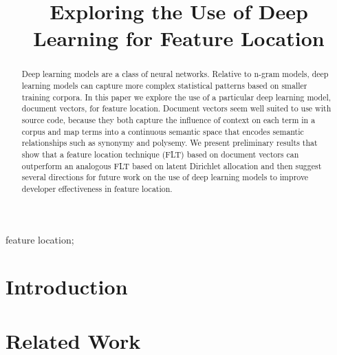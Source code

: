 \documentclass[conference]{IEEEtran}
\begin{document}
\title{Exploring the Use of Deep Learning for Feature Location}
\author{
    \and
    \and
}


\maketitle

\begin{abstract}
Deep learning models are a class of neural networks. Relative to n-gram models, deep learning models can capture more complex statistical patterns based on smaller training corpora. In this paper we explore the use of a particular deep learning model, document vectors, for feature location. Document vectors seem well suited to use with source code, because they both capture the influence of context on each term in a corpus and map terms into a continuous semantic space that encodes semantic relationships such as synonymy and polysemy. We present preliminary results that show that a feature location technique (FLT) based on document vectors can outperform an analogous FLT based on latent Dirichlet allocation and then suggest several directions for future work on the use of deep learning models to improve developer effectiveness in feature location.
\end{abstract}

\begin{IEEEkeywords}
feature location;
\end{IEEEkeywords}

\section{Introduction}\label{introduction}         


\section{Related Work}\label{related}

\end{document}
